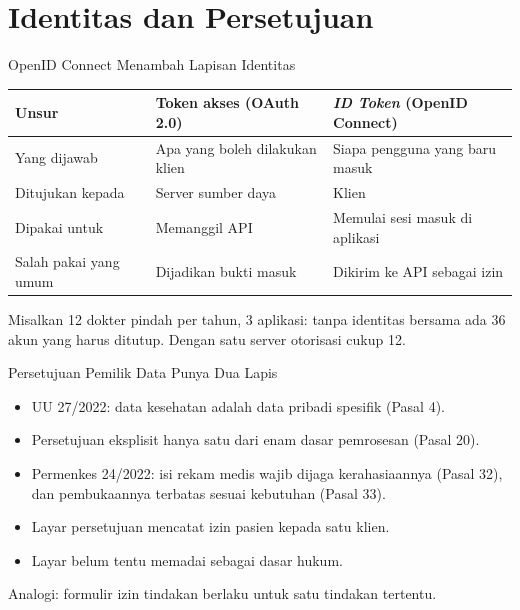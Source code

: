 \documentclass[aspectratio=169, table, 12pt]{beamer}
\begin{document}
\section{Identitas dan Persetujuan}

\begin{frame}{{\Large OpenID Connect Menambah Lapisan Identitas}}
  \small
  \begin{tabularx}{\textwidth}{>{\raggedright\arraybackslash}p{3.4cm}
      >{\raggedright\arraybackslash}X >{\raggedright\arraybackslash}X}
    \hline
    \textbf{Unsur} & \textbf{Token akses (OAuth 2.0)} & \textbf{\textit{ID Token} (OpenID Connect)} \\ \hline
    Yang dijawab & Apa yang boleh dilakukan klien & Siapa pengguna yang baru masuk \\ \hline
    Ditujukan kepada & Server sumber daya & Klien \\ \hline
    Dipakai untuk & Memanggil API & Memulai sesi masuk di aplikasi \\ \hline
    Salah pakai yang umum & Dijadikan bukti masuk & Dikirim ke API sebagai izin \\ \hline
  \end{tabularx}

  \vspace{8pt}
  Misalkan 12 dokter pindah per tahun, 3 aplikasi: tanpa identitas bersama ada 36 akun yang harus ditutup. Dengan satu server otorisasi cukup 12.
\end{frame}

\begin{frame}{{\Large Persetujuan Pemilik Data Punya Dua Lapis}}
  \vspace{6pt}
  \begin{itemize}
    \item UU 27/2022: data kesehatan adalah data pribadi spesifik (Pasal 4).
    \item Persetujuan eksplisit hanya satu dari enam dasar pemrosesan (Pasal 20).
    \item Permenkes 24/2022: isi rekam medis wajib dijaga kerahasiaannya (Pasal 32), dan pembukaannya terbatas sesuai kebutuhan (Pasal 33).
    \item Layar persetujuan mencatat izin pasien kepada satu klien.
    \item Layar belum tentu memadai sebagai dasar hukum.
  \end{itemize}
  \vspace{4pt}
  {\small Analogi: formulir izin tindakan berlaku untuk satu tindakan tertentu.}
\end{frame}
\end{document}
